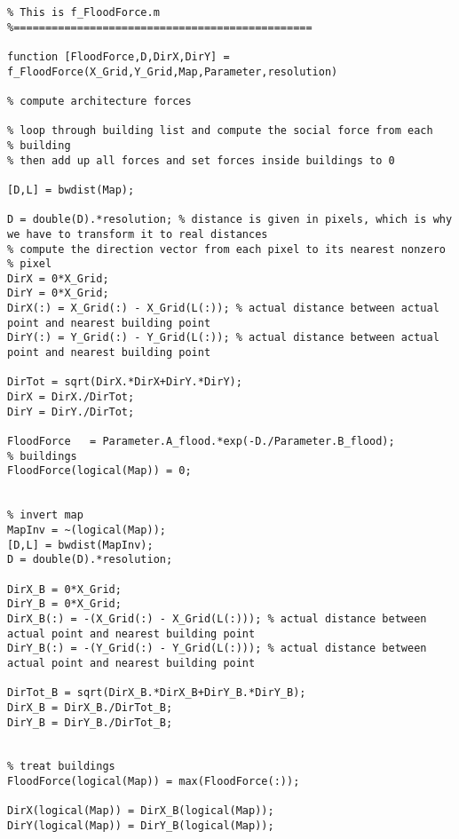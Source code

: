\lstset{basicstyle=\footnotesize\ttfamily}
    
\begin{lstlisting}[breaklines]
%===============================================
% This is f_FloodForce.m
%===============================================

function [FloodForce,D,DirX,DirY] = f_FloodForce(X_Grid,Y_Grid,Map,Parameter,resolution)

% compute architecture forces

% loop through building list and compute the social force from each
% building
% then add up all forces and set forces inside buildings to 0

[D,L] = bwdist(Map);

D = double(D).*resolution; % distance is given in pixels, which is why we have to transform it to real distances
% compute the direction vector from each pixel to its nearest nonzero
% pixel
DirX = 0*X_Grid;
DirY = 0*X_Grid;
DirX(:) = X_Grid(:) - X_Grid(L(:)); % actual distance between actual point and nearest building point
DirY(:) = Y_Grid(:) - Y_Grid(L(:)); % actual distance between actual point and nearest building point

DirTot = sqrt(DirX.*DirX+DirY.*DirY);
DirX = DirX./DirTot;
DirY = DirY./DirTot;

FloodForce   = Parameter.A_flood.*exp(-D./Parameter.B_flood);
% buildings
FloodForce(logical(Map)) = 0;


% invert map
MapInv = ~(logical(Map));
[D,L] = bwdist(MapInv);
D = double(D).*resolution;

DirX_B = 0*X_Grid;
DirY_B = 0*X_Grid;
DirX_B(:) = -(X_Grid(:) - X_Grid(L(:))); % actual distance between actual point and nearest building point
DirY_B(:) = -(Y_Grid(:) - Y_Grid(L(:))); % actual distance between actual point and nearest building point

DirTot_B = sqrt(DirX_B.*DirX_B+DirY_B.*DirY_B);
DirX_B = DirX_B./DirTot_B;
DirY_B = DirY_B./DirTot_B;


% treat buildings
FloodForce(logical(Map)) = max(FloodForce(:));

DirX(logical(Map)) = DirX_B(logical(Map));
DirY(logical(Map)) = DirY_B(logical(Map));
\end{lstlisting}